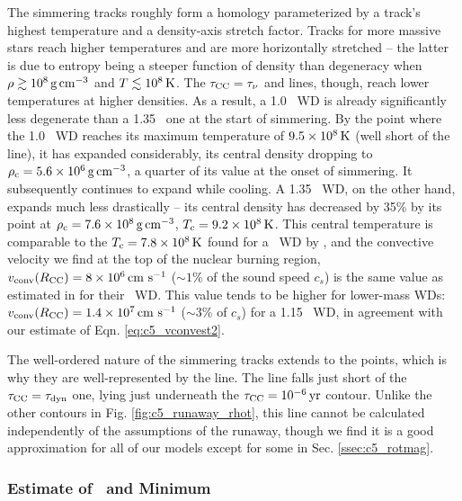 
The simmering tracks roughly form a homology parameterized by a track's highest temperature and a density-axis stretch factor.  Tracks for more massive stars reach higher temperatures and are more horizontally stretched -- the latter is due to entropy being a steeper function of density than degeneracy when $\rho\gtrsim10^8\,\gcc$ and $T\lesssim10^8\,\mathrm{K}$.  The $\taucc = \taunu$ and \citeal{wooswk04} lines, though, reach lower temperatures at higher densities.  As a result, a 1.0 \Msun\ WD is already significantly less degenerate than a 1.35 \Msun\ one at the start of simmering.  By the point where the 1.0 \Msun\ WD reaches its maximum temperature of $9.5\times10^8\,\mathrm{K}$ (well short of the \citeal{wooswk04} line), it has expanded considerably, its central density dropping to $\rhoc = 5.6\times10^6\,\gcc$, a quarter of its value at the onset of simmering.  It subsequently continues to expand while cooling.  A 1.35 \Msun\ WD, on the other hand, expands much less drastically -- its central density has decreased by 35\% by its \citeal{wooswk04} point at $\rhoc = 7.6\times10^8\,\gcc$, $\Tc = 9.2\times10^8\,\mrm{K}$.  This central temperature is comparable to the $\Tc = 7.8\times10^8\,\mrm{K}$ found for a \Mch\ WD by \citeal{wooswk04}, and the convective velocity we find at the top of the nuclear burning region, $\vconvrcc = 8\times10^6\,\cmpsec$ ($\sim1$\% of the sound speed $c_s$) is the same value as estimated in \citeal{wooswk04} for their \Mch\ WD.  This value tends to be higher for lower-mass WDs: $\vconvrcc = 1.4\times10^7\,\cmpsec$ ($\sim3$\% of $c_s$) for a 1.15 \Msun\ WD, in agreement with our estimate of Eqn. \ref{eq:c5_vconvest2}.

The well-ordered nature of the simmering tracks extends to the \citeal{wooswk04} points, which is why they are well-represented by the \citeal{wooswk04} line.  The line falls just short of the $\taucc = \taudyn$ one, lying just underneath the $\taucc = 10^{-6}\,\mrm{yr}$ contour.  Unlike the other contours in Fig. \ref{fig:c5_runaway_rhot}, this line cannot be calculated independently of the assumptions of the runaway, though we find it is a good approximation for all of our models except for some in Sec. \ref{ssec:c5_rotmag}.

\subsubsection{Estimate of \Mcrit\ and Minimum \MNi}
\label{sssec:c5_mcritest_adiabatic}

